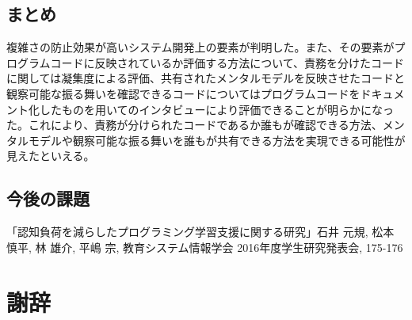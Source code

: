 \documentclass[11pt, a4paper]{jreport}
\begin{document}
\section{まとめ}
複雑さの防止効果が高いシステム開発上の要素が判明した。また、その要素がプログラムコードに反映されているか評価する方法について、責務を分けたコードに関しては凝集度による評価、共有されたメンタルモデルを反映させたコードと観察可能な振る舞いを確認できるコードについてはプログラムコードをドキュメント化したものを用いてのインタビューにより評価できることが明らかになった。これにより、責務が分けられたコードであるか誰もが確認できる方法、メンタルモデルや観察可能な振る舞いを誰もが共有できる方法を実現できる可能性が見えたといえる。
\section{今後の課題}
\renewcommand{\bibname}{参考文献}
\begin{thebibliography}{10}
「認知負荷を減らしたプログラミング学習支援に関する研究」石井 元規, 松本 慎平, 林 雄介, 平嶋 宗, 教育システム情報学会 2016年度学生研究発表会, 175-176
\end{thebibliography}

\chapter*{謝辞}
\end{document}
